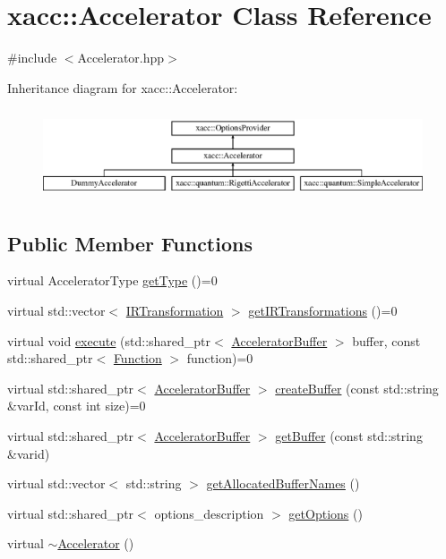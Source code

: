\hypertarget{a01435}{}\section{xacc\+:\+:Accelerator Class Reference}
\label{a01435}


{\ttfamily \#include $<$Accelerator.\+hpp$>$}

Inheritance diagram for xacc\+:\+:Accelerator\+:\begin{figure}[H]
\begin{center}
\leavevmode
\includegraphics[height=2.679426cm]{a01435}
\end{center}
\end{figure}
\subsection*{Public Member Functions}
\begin{DoxyCompactItemize}
\item 
virtual Accelerator\+Type \hyperlink{a01435_aaffc3e4bb9880eb5041b1b58ee4c2665}{get\+Type} ()=0
\item 
virtual std\+::vector$<$ \hyperlink{a01503}{I\+R\+Transformation} $>$ \hyperlink{a01435_ad6e4a642dcb24e552675bcbeff1e1b04}{get\+I\+R\+Transformations} ()=0
\item 
virtual void \hyperlink{a01435_a89b3f3e6294f228abf03a410b0fb1674}{execute} (std\+::shared\+\_\+ptr$<$ \hyperlink{a01447}{Accelerator\+Buffer} $>$ buffer, const std\+::shared\+\_\+ptr$<$ \hyperlink{a01475}{Function} $>$ function)=0
\item 
virtual std\+::shared\+\_\+ptr$<$ \hyperlink{a01447}{Accelerator\+Buffer} $>$ \hyperlink{a01435_a064a2dbd58338364115c260267806945}{create\+Buffer} (const std\+::string \&var\+Id, const int size)=0
\item 
virtual std\+::shared\+\_\+ptr$<$ \hyperlink{a01447}{Accelerator\+Buffer} $>$ \hyperlink{a01435_ab3820be326e28a553fed1a824f4d41d0}{get\+Buffer} (const std\+::string \&varid)
\item 
virtual std\+::vector$<$ std\+::string $>$ \hyperlink{a01435_ae1463d7e405df89fa4af47e8922f4b82}{get\+Allocated\+Buffer\+Names} ()
\item 
virtual std\+::shared\+\_\+ptr$<$ options\+\_\+description $>$ \hyperlink{a01435_a98c9eda6b54367c75667ecfbbf167979}{get\+Options} ()
\item 
virtual \hyperlink{a01435_aed88ab0d71b765f0b0f512684ccd4b55}{$\sim$\+Accelerator} ()
\end{DoxyCompactItemize}
